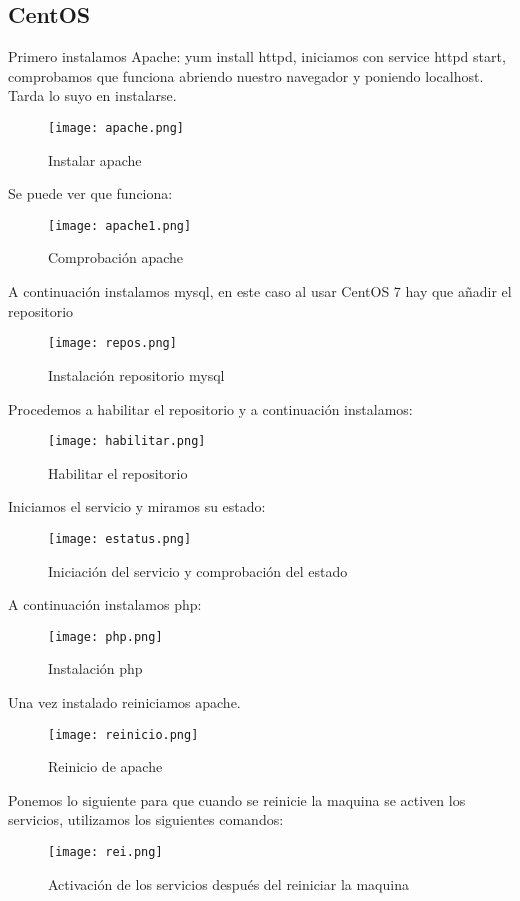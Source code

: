 \subsection{CentOS}
Primero instalamos Apache: yum install httpd, iniciamos con service httpd start, comprobamos que funciona abriendo nuestro navegador y poniendo localhost.
\\Tarda lo suyo en instalarse.
\begin{figure}[H] 
\centering
\texttt{[image: apache.png]}  
\label{figura15:}
\caption{Instalar apache}
\end{figure}
Se puede ver que funciona:
\begin{figure}[H] 
\centering
\texttt{[image: apache1.png]}  
\label{figura16:}
\caption{Comprobación apache}
\end{figure}
A continuación instalamos mysql, en este caso al usar CentOS 7 hay que añadir el repositorio
\begin{figure}[H] 
\centering
\texttt{[image: repos.png]}  
\label{figura17:}
\caption{Instalación repositorio mysql}
\end{figure}
Procedemos a habilitar el repositorio y a continuación instalamos:
\begin{figure}[H] 
\centering
\texttt{[image: habilitar.png]}  
\label{figura18:}
\caption{Habilitar el repositorio}
\end{figure}
Iniciamos el servicio y miramos su estado:
\begin{figure}[H] 
\centering
\texttt{[image: estatus.png]}  
\label{figura19:}
\caption{Iniciación del servicio y comprobación del estado}
\end{figure}
A continuación instalamos php:
\begin{figure}[H] 
\centering
\texttt{[image: php.png]}  
\label{figura20:}
\caption{Instalación php}
\end{figure}
Una vez instalado reiniciamos apache.
\begin{figure}[H] 
\centering
\texttt{[image: reinicio.png]}  
\label{figura21:}
\caption{Reinicio de apache}
\end{figure}
Ponemos lo siguiente para que cuando se reinicie la maquina se activen los servicios, utilizamos los siguientes comandos:
\begin{figure}[H] 
\centering
\texttt{[image: rei.png]}  
\label{figura22:}
\caption{Activación de los servicios después del reiniciar la maquina}
\end{figure}

